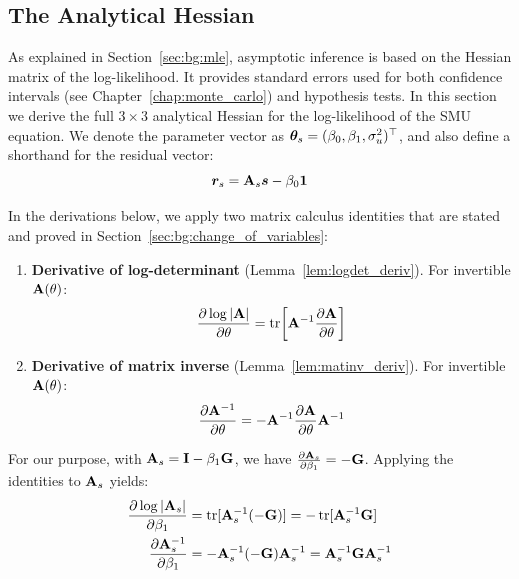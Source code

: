 \subsection{The Analytical Hessian}
\label{sec:est:screen_hessian}
As explained in Section~\ref{sec:bg:mle}, asymptotic inference is based on the Hessian matrix of the log-likelihood. It provides standard errors used for both confidence intervals (see Chapter~\ref{chap:monte_carlo}) and hypothesis tests. In this section we derive the full $3 \times 3$ analytical Hessian for the log-likelihood of the SMU equation. We denote the parameter vector as $\bm{\theta}_s = (\beta_0, \beta_1, \sigma_u^2)^\top$, and also define a shorthand for the residual vector:
\begin{equation}
    \bm{r}_s = \mathbf{A}_s\bm{s} - \beta_0\bm{1}
\end{equation}

In the derivations below, we apply two matrix calculus identities that are stated and proved in Section~\ref{sec:bg:change_of_variables}:
\begin{enumerate}
    \item \textbf{Derivative of log-determinant} (Lemma~\ref{lem:logdet_deriv}). For invertible $\mathbf{A}(\theta)$:
    \begin{equation*}
        \frac{\partial \log|\mathbf{A}|}{\partial \theta} = \operatorname{tr}\!\left[\mathbf{A}^{-1}\frac{\partial \mathbf{A}}{\partial \theta}\right]
    \end{equation*}

    \item \textbf{Derivative of matrix inverse} (Lemma~\ref{lem:matinv_deriv}). For invertible $\mathbf{A}(\theta)$:
    \begin{equation*}
        \frac{\partial \mathbf{A}^{-1}}{\partial \theta} = -\mathbf{A}^{-1}\frac{\partial \mathbf{A}}{\partial \theta}\mathbf{A}^{-1}
    \end{equation*}
\end{enumerate}

For our purpose, with $\mathbf{A}_s = \mathbf{I} - \beta_1\mathbf{G}$, we have $\frac{\partial \mathbf{A}_s}{\partial \beta_1} = -\mathbf{G}$. Applying the identities to $\mathbf{A}_s$ yields:
\begin{align}
    \frac{\partial \log|\mathbf{A}_s|}{\partial \beta_1} &= \operatorname{tr}[\mathbf{A}_s^{-1}(-\mathbf{G})] = -\operatorname{tr}[\mathbf{A}_s^{-1}\mathbf{G}] \label{eq:logdet_screen_applied} \\
    \frac{\partial \mathbf{A}_s^{-1}}{\partial \beta_1} &= -\mathbf{A}_s^{-1}(-\mathbf{G})\mathbf{A}_s^{-1} = \mathbf{A}_s^{-1}\mathbf{G}\mathbf{A}_s^{-1} \label{eq:matinv_screen_applied}
\end{align}

